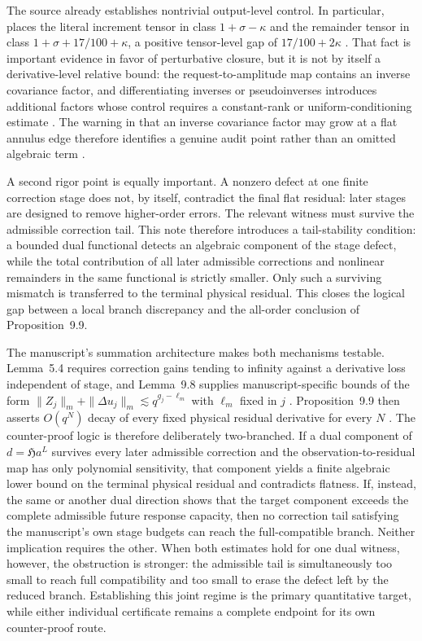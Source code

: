 \documentclass[12pt]{article}
\theoremstyle{plain}
\theoremstyle{definition}
\theoremstyle{remark}
\newcommand{\Hidden}{\mathfrak H}
\begin{document}
The source already establishes nontrivial output-level control. In particular,  places the literal increment tensor in class \(1+\sigma-\kappa\) and the remainder tensor in class \(1+\sigma+17/100+\kappa\), a positive tensor-level gap of \(17/100+2\kappa\) \cite{OpenAILeanRepo2026}. That fact is important evidence in favor of perturbative closure, but it is not by itself a derivative-level relative bound: the request-to-amplitude map contains an inverse covariance factor, and differentiating inverses or pseudoinverses introduces additional factors whose control requires a constant-rank or uniform-conditioning estimate \cite{GolubPereyra1973,StewartSun1990}. The warning in  that an inverse covariance factor may grow at a flat annulus edge therefore identifies a genuine audit point rather than an omitted algebraic term \cite{OpenAILeanRepo2026}.

A second rigor point is equally important. A nonzero defect at one finite correction stage does not, by itself, contradict the final flat residual: later stages are designed to remove higher-order errors. The relevant witness must survive the admissible correction tail. This note therefore introduces a tail-stability condition: a bounded dual functional detects an algebraic component of the stage defect, while the total contribution of all later admissible corrections and nonlinear remainders in the same functional is strictly smaller. Only such a surviving mismatch is transferred to the terminal physical residual. This closes the logical gap between a local branch discrepancy and the all-order conclusion of Proposition~9.9.

The manuscript's summation architecture makes both mechanisms testable. Lemma~5.4 requires correction gains tending to infinity against a derivative loss independent of stage, and Lemma~9.8 supplies manuscript-specific bounds of the form \(\|Z_j\|_m+\|\Delta u_j\|_m\lesssim q^{g_j-\ell_m}\) with \(\ell_m\) fixed in \(j\) \cite[Lemmas~5.4 and 9.8]{OpenAI2026}. Proposition~9.9 then asserts \(O(q^N)\) decay of every fixed physical residual derivative for every \(N\) \cite[Prop.~9.9]{OpenAI2026}. The counter-proof logic is therefore deliberately two-branched. If a dual component of \(d=\Hidden a^L\) survives every later admissible correction and the observation-to-residual map has only polynomial sensitivity, that component yields a finite algebraic lower bound on the terminal physical residual and contradicts flatness. If, instead, the same or another dual direction shows that the target component exceeds the complete admissible future response capacity, then no correction tail satisfying the manuscript's own stage budgets can reach the full-compatible branch. Neither implication requires the other. When both estimates hold for one dual witness, however, the obstruction is stronger: the admissible tail is simultaneously too small to reach full compatibility and too small to erase the defect left by the reduced branch. Establishing this joint regime is the primary quantitative target, while either individual certificate remains a complete endpoint for its own counter-proof route.
\end{document}
